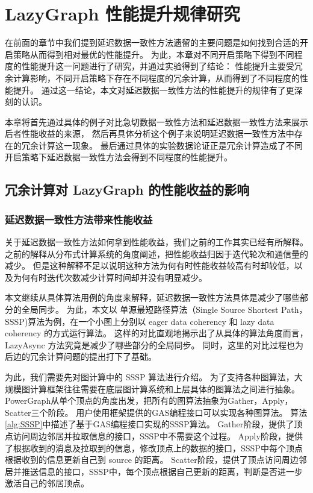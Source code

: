 

\chapter{LazyGraph 性能提升规律研究}
在前面的章节中我们提到延迟数据一致性方法遗留的主要问题是如何找到合适的开启策略从而得到相对最优的性能提升。
为此，本章对不同开启策略下得到不同程度的性能提升这一问题进行了研究，并通过实验得到了结论：
性能提升主要受冗余计算影响，不同开启策略下存在不同程度的冗余计算，从而得到了不同程度的性能提升。
通过这一结论，本文对延迟数据一致性方法的性能提升的规律有了更深刻的认识。

本章将首先通过具体的例子对比急切数据一致性方法和延迟数据一致性方法来展示后者性能收益的来源，
然后再具体分析这个例子来说明延迟数据一致性方法中存在的冗余计算这一现象。
最后通过具体的实验数据论证正是冗余计算造成了不同开启策略下延迟数据一致性方法会得到不同程度的性能提升。



\section{冗余计算对 LazyGraph 的性能收益的影响}
\subsection{延迟数据一致性方法带来性能收益}
关于延迟数据一致性方法如何拿到性能收益，我们之前的工作其实已经有所解释。
之前的解释从分布式计算系统的角度阐述，把性能收益归因于迭代轮次和通信量的减少。
但是这种解释不足以说明这种方法为何有时性能收益较高有时却较低，以及为何有时迭代次数减少计算时间却并没有明显减少。


本文继续从具体算法用例的角度来解释，延迟数据一致性方法具体是减少了哪些部分的全局同步。
为此，本文以 单源最短路径算法（Single Source Shortest Path，SSSP)算法为例，在一个小图上分别以 eager data coherency 和 lazy data coherency 的方式运行算法。
这样的对比直观地揭示出了从具体的算法角度而言，LazyAsync 方法究竟是减少了哪些部分的全局同步。
同时，这里的对比过程也为后边的冗余计算问题的提出打下了基础。


为此，我们需要先对图计算中的 SSSP 算法进行介绍。
为了支持各种图算法，大规模图计算框架往往需要在底层图计算系统和上层具体的图算法之间进行抽象。
PowerGraph从单个顶点的角度出发\cite{McCune@CS15}，把所有的图算法抽象为Gather，Apply，Scatter三个阶段。
用户使用框架提供的GAS编程接口可以实现各种图算法。
算法\ref{alg:SSSP}中描述了基于GAS编程接口实现的SSSP算法。
Gather阶段，提供了顶点访问周边邻居并拉取信息的接口，SSSP中不需要这个过程。
Apply阶段，提供了根据收到的消息及拉取到的信息，修改顶点上的数据的接口，SSSP中每个顶点根据收到的信息更新自己到 source 的距离。
Scatter阶段，提供了顶点访问周边邻居并推送信息的接口，SSSP中，每个顶点根据自己更新的距离，判断是否进一步激活自己的邻居顶点。


